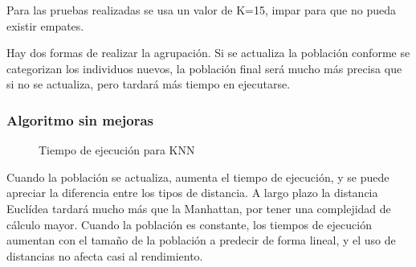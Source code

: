 		
		\begin{flushleft}
		\begin{tcolorbox}[boxrule=0.5pt, fontupper=\small]
			\scriptsize
			Para las pruebas realizadas se usa un valor de K=15, impar para que no pueda existir empates.		
		\end{tcolorbox}		
		\end{flushleft}
		
		
		Hay dos formas de realizar la agrupación. Si se actualiza la población conforme se categorizan los individuos nuevos, la población final será mucho más precisa que si no se actualiza, pero tardará más tiempo en ejecutarse. 
		
		\subsubsection{Algoritmo sin mejoras}

			\begin{figure}[h!]
				\centering
				\caption{Tiempo de ejecución para KNN}
			\end{figure}

			Cuando la población se actualiza, aumenta el tiempo de ejecución, y se puede apreciar la diferencia entre los tipos de distancia. A largo plazo la distancia Euclídea tardará mucho más que la Manhattan, por tener una complejidad de cálculo mayor. 
			Cuando la población es constante, los tiempos de ejecución aumentan con el tamaño de la población a predecir de forma lineal, y el uso de distancias no afecta casi al rendimiento.
		
